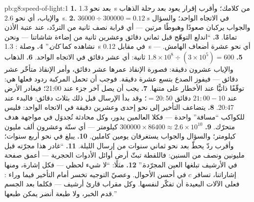 \begin{solution}{pb:g8:speed-of-light:1}
\textbf{1.} بعد نحو \qty{1.3}{s} من كلامك؛ وأقرب إقرار يعود
بعد رحلة الذهاب والإياب، أي نحو \qty{2.6}{s}.
\textbf{2.} $36000 \div 300000 = \qty{0.12}{s}$ في الاتجاه
الواحد؛ والسؤال والجواب يركبان صعودًا وهبوطًا مرتين --- أي
قرابة نصف ثانية من التردّد، عند عتبة الأذن تمامًا.
\textbf{3.} ``اندلع التوهّج قبل ثماني دقائق وعشرين ثانية من
إضاءة شاشاتنا --- ونحن نشاهده كما \emph{كان}.''
\textbf{4.} وصلة : \qty{1.3}{s} في مقابل \qty{0.12}{s}
--- أي نحو عشرة أضعاف الهامش.
\textbf{5.} $1.8 \times 10^{8} \div (3 \times 10^{5}) = 600$
ثانية: أي عشر دقائق في الاتجاه الواحد.
\textbf{6.} الذهاب والإياب عشرون دقيقة: فصورة الإنقاذ عمرها
عشر دقائق، وأمر الإنقاذ متأخّر عشر دقائق --- فيفوز الصدع
بتسع عشرة دقيقة. فوجب أن تحمل المركبة ردود فعلها هي: توقّفًا
ذاتيًّا عند الأخطار على متنها.
\textbf{7.} يجب أن يصل آخر جزء عند 21:00؛ فيغادر الأرض عند
$21{:}00 - 10$ دقائق $= 20{:}50$؛ وقد بدأ الإرسال قبل ذلك
بثلاث دقائق: فالبدء عند 20:47.
\textbf{8.} يتضاعف التأخير إلى نحو إحدى وعشرين دقيقة في
الاتجاه الواحد: فليس للكواكب ``مسافة'' واحدة --- فكلا
العالمين يدور، وكل محادثة تُجدوَل في مواجهة هدف متحرّك.
\textbf{9.} $300000 \times 86400 \approx 2.6 \times 10^{10}$
كيلومتر --- أي ستّة وعشرون ألف مليون كيلومتر؛ والسؤال والجواب
يستغرقان يومين كاملين.
\textbf{10.} يبلغ   في نحو أربع سنوات؛ وأقرب ردّ
يحطّ بعد نحو ثماني سنوات من إرسال الليلة.
\textbf{11.} ``غادر هذا  مجرّته قبل مليونين ونصف من
السنين: فاللقطة تبثّ أرض أوائل الأدوات الحجرية --- أعمق صفحة
في الأرشيف تبلغها العين المجرّدة.''
\textbf{12.} مثلًا: ``لا شيء لحظي --- فكل إشارة، ومنها
إشاراتنا، تسافر  $c$ في أحسن الأحوال. وعصيّ التوجيه تخسر
أمام التأخير فيما وراء : فعلى الآلات البعيدة أن تفكّر
لنفسها. وكل مقراب قارئ أرشيف --- فكلما بعد الجسم قدم الخبر،
ولا طبعة أنضر يمكن طبعها.''
\end{solution}
